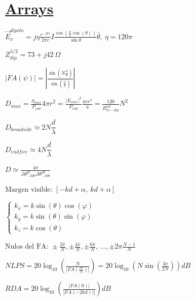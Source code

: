 \documentclass[twocolumn, 8pt]{extarticle}
\begin{document}
\section*{\underline{Arrays}}
\( \vec{E}_{x}^{dipolo} = j \eta \frac{ e^{-jkr} }{ 2 \pi r } I \frac{ \cos\left(\frac{\pi}{2} \cos(\theta)\right) }{\sin{\theta}} \hat{\theta},\ \eta = 120\pi \)

\vspace{0.5cm}
\( Z_{dip}^{\lambda / 2} = 73 + j42 \  \Omega \)

\vspace{0.5cm}
\( \left|FA(\psi)\right| = \left|\frac{ \sin(N \frac{\psi}{2}) }{ \sin(\frac{\psi}{2}) } \right|\)

\vspace{0.5cm}
\( D_{max} = \frac{ S_{max} }{ P_{rad}} 4\pi r^2  = \frac{ \left|E_{max}\right|^2 }{ P_{rad}} \frac{4\pi r^2}{\eta} = \frac{120}{R^{tot}_{in-dip}}N^2 \)

\vspace{0.5cm}
\( D_{broadside} \simeq  2N \dfrac{d}{\lambda}\)

\vspace{0.5cm}
\( D_{endfire} \simeq  4N \dfrac{d}{\lambda}\)

\vspace{0.5cm}
\( D \simeq \frac{4\pi}{\Delta\theta_{-3db}^{E} \Delta\theta_{-3db}^{H}} \)

\vspace{0.5cm}
\( \text{Margen visible: } [-kd + \alpha,\ kd + \alpha] \)

\vspace{0.5cm}
\(\left \{
\begin{array}{l}
	k_x = k \sin(\theta) \cos(\varphi) \\
	k_y = k \sin(\theta) \sin(\varphi) \\
	k_z = k \cos(\theta)
\end{array}
\right .
\)

\vspace{0.5cm}
\( \text{Nulos del FA: } \pm\frac{ 2\pi }{ N }, \pm\frac{ 4\pi }{ N }, \pm\frac{ 6\pi }{ N }, \, \dots  ,\pm2\pi \frac{N - 1}{N} \)

\vspace{0.5cm}
\( NLPS = 20 \log_{10} \left(\frac{ N }{\left|FA\left(\frac{ 3\pi }{ N }\right)\right|} \right) = 20 \log_{10} \left(N \sin\left( \frac{ 3\pi }{ 2N }\right)\right) dB \)

\vspace{0.5cm}
\( RDA = 20 \log_{10} \left( \frac{ \left|FA(0)\right| }{ \left|FA(-2kd))\right| } \right) dB \)
\end{document}
